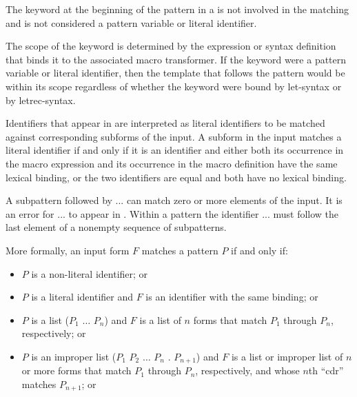 \begin{entry}{%
}
The keyword at the beginning of the pattern in a
 is not involved in the matching and
is not considered a pattern variable or literal identifier.

\begin{rationale}
The scope of the keyword is determined by the expression or syntax
definition that binds it to the associated macro transformer.
If the keyword were a pattern variable or literal
identifier, then
the template that follows the pattern would be within its scope
regardless of whether the keyword were bound by {\cf let-syntax}
or by {\cf letrec-syntax}.
\end{rationale}

Identifiers that appear in  are interpreted as literal
identifiers to be matched against corresponding subforms of the input.
A subform
in the input matches a literal identifier if and only if it is an
identifier
and either both its occurrence in the macro expression and its
occurrence in the macro definition have the same lexical binding, or
the two identifiers are equal and both have no lexical binding.


A subpattern followed by {\cf ...} can match zero or more elements of the
input.  It is an error for {\cf ...} to appear in .
Within a pattern the identifier {\cf ...} must follow the last element of
a nonempty sequence of subpatterns.

More formally, an input form $F$ matches a pattern $P$ if and only if:

\begin{itemize}
\item $P$ is a non-literal identifier; or

\item $P$ is a literal identifier and $F$ is an identifier with the same
      binding; or

\item $P$ is a list {\cf ($P_1$ $\dots$ $P_n$)} and $F$ is a
      list of $n$
      forms that match $P_1$ through $P_n$, respectively; or

\item $P$ is an improper list
      {\cf ($P_1$ $P_2$ $\dots$ $P_n$ . $P_{n+1}$)}
      and $F$ is a list or
      improper list of $n$ or more forms that match $P_1$ through $P_n$,
      respectively, and whose $n$th ``cdr'' matches $P_{n+1}$; or


\end{itemize}
\end{entry}
